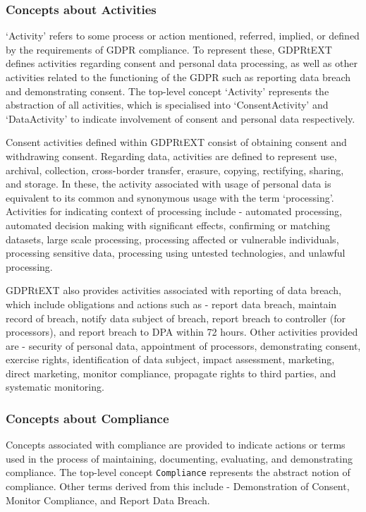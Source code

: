 \subsubsection{Concepts about Activities}
`Activity' refers to some process or action mentioned, referred, implied, or defined by the requirements of GDPR compliance. To represent these, GDPRtEXT defines activities regarding consent and personal data processing, as well as other activities related to the functioning of the GDPR such as reporting data breach and demonstrating consent. The top-level concept `Activity' represents the abstraction of all activities, which is specialised into `ConsentActivity' and `DataActivity' to indicate involvement of consent and personal data respectively.

Consent activities defined within GDPRtEXT consist of obtaining consent and withdrawing consent. Regarding data, activities are defined to represent use, archival, collection, cross-border transfer, erasure, copying, rectifying, sharing, and storage. In these, the activity associated with usage of personal data is equivalent to its common and synonymous usage with the term `processing'. Activities for indicating context of processing include - automated processing,  automated decision making with significant effects, confirming or matching datasets, large scale processing, processing affected or vulnerable individuals, processing sensitive data, processing using untested technologies, and unlawful processing.

GDPRtEXT also provides activities associated with reporting of data breach, which include obligations and actions such as - report data breach, maintain record of breach, notify data subject of breach, report breach to controller (for processors), and report breach to DPA within 72 hours. Other activities provided are - security of personal data, appointment of processors, demonstrating consent, exercise rights, identification of data subject, impact assessment, marketing, direct marketing, monitor compliance, propagate rights to third parties, and systematic monitoring.

\subsubsection{Concepts about Compliance}
Concepts associated with compliance are provided to indicate actions or terms used in the process of maintaining, documenting, evaluating, and demonstrating compliance. The top-level concept \texttt{Compliance} represents the abstract notion of compliance. Other terms derived from this include - Demonstration of Consent, Monitor Compliance, and Report Data Breach.

